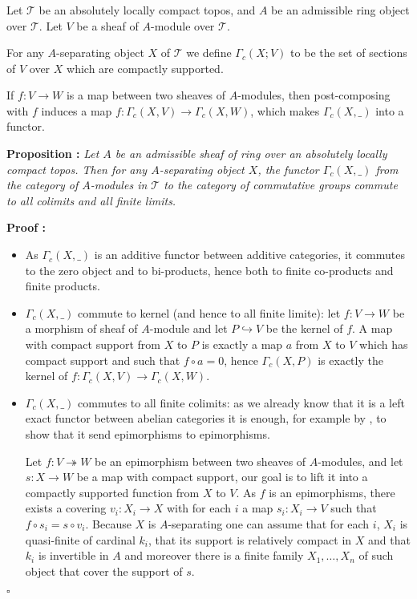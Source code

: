 \documentclass[a4paper]{article}
\newcommand{\Tcal}{\mathcal{T}}
\newcommand{\block}[1]
{

\par \subsubsection{} #1

\bigskip}
\newcommand{\Prop}[1]
	{

	\bigskip
	
	\textbf{Proposition : }{\itshape #1}
		
	\bigskip
	
	}
\newcommand{\Dem}[1]{
	
	\smallskip
	
	\textbf{Proof : } \par
	 {#1} $\square$
	 
	 \bigskip
}
\begin{document}
\block{\label{Prop_gammac_colimit}Let $\Tcal$ be an absolutely locally compact topos, and $A$ be an admissible ring object over $\Tcal$. 
Let $V$ be a sheaf of $A$-module over $\Tcal$.

For any $A$-separating object $X$ of $\Tcal$ we define $\Gamma_c(X; V)$ to be the set of sections of $V$ over $X$ which are compactly supported.


If $f : V \rightarrow W$ is a map between two sheaves of $A$-modules, then post-composing with $f$ induces a map $f :\Gamma_c(X,V) \rightarrow \Gamma_c(X,W)$, which makes $\Gamma_c(X, \_ )$ into a functor.

\Prop{Let $A$ be an admissible sheaf of ring over an absolutely locally compact topos. Then for any $A$-separating object $X$, the functor $\Gamma_c(X, \_ )$ from the category of $A$-modules in $\Tcal$ to the category of commutative groups commute to all colimits and all finite limits.}



\Dem{


\begin{itemize}

\item As $\Gamma_c(X, \_)$ is an additive functor between additive categories, it commutes to the zero object and to bi-products, hence both to finite co-products and finite products.

\item $\Gamma_c(X, \_)$ commute to kernel (and hence to all finite limite): let $f:V \rightarrow W$ be a morphism of sheaf of $A$-module and let $P \hookrightarrow V$ be the kernel of $f$. A map with compact support from $X$ to $P$ is exactly a map $a$ from $X$ to $V$ which has compact support and such that $f \circ a = 0$, hence $\Gamma_c(X,P)$ is exactly the kernel of $f: \Gamma_c(X,V) \rightarrow \Gamma_c(X,W)$.

\item $\Gamma_c(X, \_)$ commutes to all finite colimits: as we already know that it is a left exact functor between abelian categories it is enough, for example by \cite[1.11.2 and 1.11.4]{borceux2}, to show that it send epimorphisms to epimorphisms.

Let $f:  V \twoheadrightarrow W$ be an epimorphism between two sheaves of $A$-modules, and let $s: X \rightarrow W$ be a map with compact support, our goal is to lift it into a compactly supported function from $X$ to $V$.
As $f$ is an epimorphisms, there exists a covering $v_i:X_i \rightarrow X$ with for each $i$ a map $s_i : X_i \rightarrow V$ such that $f \circ s_i = s \circ v_i$. Because $X$ is $A$-separating one can assume that for each $i$, $X_i$ is quasi-finite of cardinal $k_i$, that its support is relatively compact in $X$ and that $k_i$ is invertible in $A$ and moreover there is a finite family $X_1, \dots, X_n$ of such object that cover the support of $s$.


\end{itemize}}}
\end{document}
